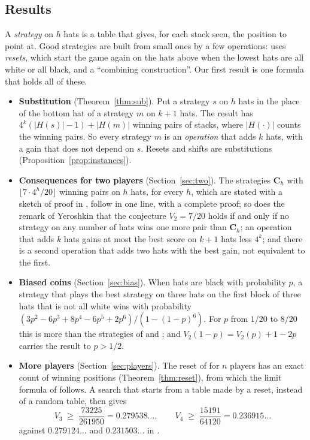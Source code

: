 \documentclass[11pt,a4paper]{article}
\theoremstyle{definition}
\theoremstyle{remark}
\newcommand{\C}{\mathbf{C}}
\begin{document}
\subsection{Results}

A \emph{strategy} on $h$ hats is a table that gives, for each stack seen,
the position to point at. Good strategies are built from small ones by a
few operations: \cite{BFG} uses \emph{resets}, which start the game again
on the hats above when the lowest hats are all white or all black, and
\cite{BCCZW} a ``combining construction''. Our first result is one
formula that holds all of these.

\begin{itemize}
\item \textbf{Substitution} (Theorem~\ref{thm:sub}). Put a strategy $s$
  on $h$ hats in the place of the bottom hat of a strategy $m$ on $k+1$
  hats. The result has $4^k(|H(s)|-1)+|H(m)|$ winning pairs of stacks,
  where $|H(\cdot)|$ counts the winning pairs. So every strategy $m$ is
  an \emph{operation} that adds $k$ hats, with a gain that does not
  depend on $s$. Resets and shifts are substitutions
  (Proposition~\ref{prop:instances}).
\item \textbf{Consequences for two players} (Section~\ref{sec:two}).
  The strategies $\C_h$ with
  $\lfloor 7\cdot 4^h/20\rfloor$ winning pairs on $h$ hats, for every
  $h$, which are stated with a sketch of proof in \cite{VW20}, follow in
  one line, with a complete proof; so does the remark of Yeroshkin
  \cite{VW20} that the conjecture $V_2 = 7/20$ holds if and only if no
  strategy on any number of hats wins one more pair than $\C_h$; an operation that
  adds $k$ hats gains at most the best score on $k+1$ hats less $4^k$;
  and there is a second operation that adds two hats with the best gain,
  not equivalent to the first.
\item \textbf{Biased coins} (Section~\ref{sec:bias}). When hats are
  black with probability $p$, a strategy that plays the best strategy on
  three hats on the first block of three hats that is not all white wins
  with probability
  $(3p^2-6p^3+8p^4-6p^5+2p^6)/(1-(1-p)^6)$. For $p$ from $1/20$ to
  $8/20$ this is more than the strategies of \cite{BFG} and
  \cite{BCCZW}; and $V_2(1-p) = V_2(p) + 1 - 2p$ carries the result to
  $p > 1/2$.
\item \textbf{More players} (Section~\ref{sec:players}). The reset of
  \cite{BFG} for $n$ players has an exact count of winning positions
  (Theorem~\ref{thm:reset}), from which the limit formula of \cite{BFG}
  follows. A search that starts from a table made by a reset, instead of
  a random table, then gives
  \[
    V_3 \;\ge\; \frac{73225}{261950} = 0.279538\ldots ,
    \qquad
    V_4 \;\ge\; \frac{15191}{64120} = 0.236915\ldots
  \]
  against $0.279124\ldots$ and $0.231503\ldots$ in \cite{BFG}.
\end{itemize}
\end{document}
